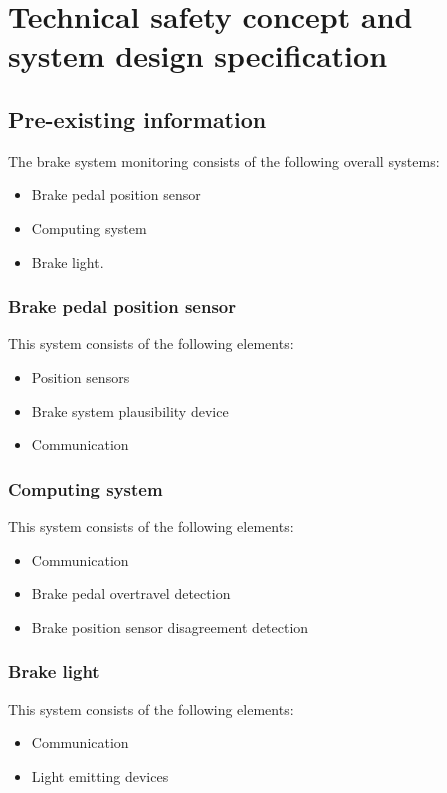 \section{Technical safety concept and system design specification}
%
% 

\subsection{Pre-existing information}
%
The brake system monitoring consists of the following overall systems:
\begin{itemize}
\item Brake pedal position sensor
\item Computing system
\item Brake light.
\end{itemize}
\subsubsection{Brake pedal position sensor}
This system consists of the following elements:
\begin{itemize}
\item Position sensors
\item Brake system plausibility device
\item Communication
\end{itemize}

\subsubsection{Computing system}
This system consists of the following elements:
\begin{itemize}
\item Communication
\item Brake pedal overtravel detection
\item Brake position sensor disagreement detection
\end{itemize}

\subsubsection{Brake light}
This system consists of the following elements:
\begin{itemize}
\item Communication
\item Light emitting devices
\end{itemize}

